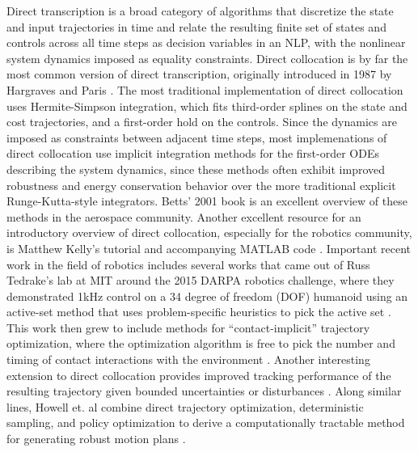 \documentclass[../root.tex]{subfiles}
\begin{document}
Direct transcription is a broad category of algorithms that discretize the
state and input trajectories in time and relate the resulting finite set of
states and controls across all time steps as decision variables in an NLP,
with the nonlinear system dynamics imposed as equality constraints. Direct
collocation is by far the most common version of direct transcription,
originally introduced in 1987 by Hargraves and Paris
\cite{hargraves_Direct_1987}. The most traditional implementation of direct
collocation uses Hermite-Simpson integration, which fits third-order splines
on the state and cost trajectories, and a first-order hold on the controls.
Since the dynamics are imposed as constraints between adjacent time steps,
most implemenations of direct collocation use implicit integration methods
for the first-order ODEs describing the system dynamics, since these methods
often exhibit improved robustness and energy conservation behavior over the
more traditional explicit Runge-Kutta-style integrators. Betts' 2001 book
\cite{betts_Practical_2001} is an excellent overview of these methods in the
aerospace community. Another excellent resource for an introductory overview
of direct collocation, especially for the robotics community, is Matthew
Kelly's tutorial and accompanying MATLAB code \cite{kelly_Introduction_2017}.
Important recent work in the field of robotics includes several works that
came out of Russ Tedrake's lab at MIT around the 2015 DARPA robotics
challenge, where they demonstrated 1kHz control on a 34 degree of freedom
(DOF) humanoid using an active-set method that uses problem-specific
heuristics to pick the active set \cite{kuindersma_Efficiently_2014}. This
work then grew to include methods for ``contact-implicit'' trajectory
optimization, where the optimization algorithm is free to pick the number and
timing of contact interactions with the environment
\cite{posa_Direct_2014,posa_Optimization_2016,manchester_Variational_2017,
patel_ContactImplicit_2019}. Another interesting extension to direct
collocation provides improved tracking performance of the resulting
trajectory given bounded uncertainties or disturbances
\cite{manchester_DIRTREL_2017}. Along similar lines, Howell et. al combine
direct trajectory optimization, deterministic sampling, and policy
optimization to derive a computationally tractable method for generating
robust motion plans \cite{howell_Direct_2021}.
\end{document}
